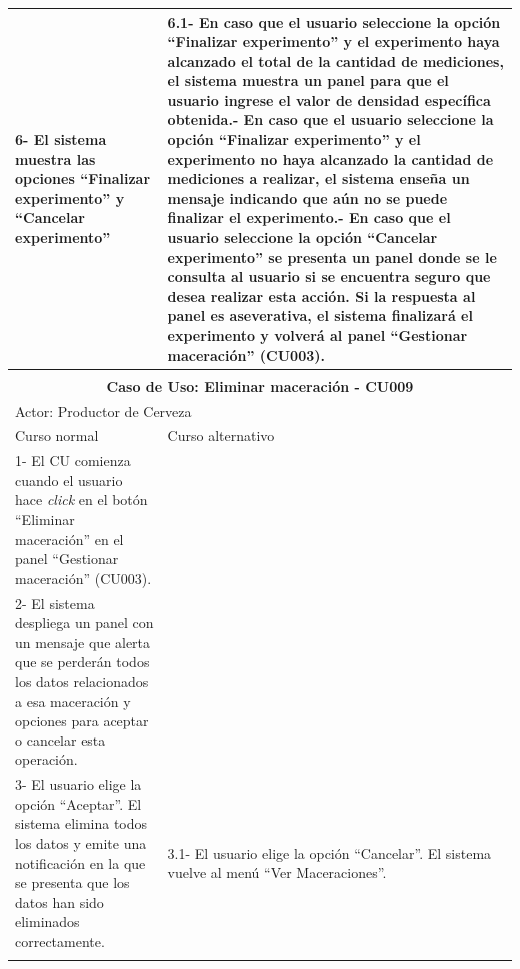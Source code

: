 \begin{longtable}{|p{7cm}|p{7cm}|}
        6- El sistema muestra las opciones ``Finalizar experimento'' y ``Cancelar experimento'' & 6.1- En caso que el usuario seleccione la opción ``Finalizar experimento'' y el experimento haya alcanzado el total de la cantidad de mediciones, el sistema muestra un panel para que el usuario ingrese el valor de densidad específica obtenida.\newline 6.2- En caso que el usuario seleccione la opción ``Finalizar experimento'' y el experimento no haya alcanzado la cantidad de mediciones a realizar, el sistema enseña un mensaje indicando que aún no se puede finalizar el experimento.\newline 
        6.3- En caso que el usuario seleccione la opción ``Cancelar experimento'' se presenta un panel donde se le consulta al usuario si se encuentra seguro que desea realizar esta acción. Si la respuesta al panel es aseverativa, el sistema finalizará el experimento y volverá al panel ``Gestionar maceración'' (CU003).\\
        \hline
       \multicolumn{2}{c}{ }\\
        \hline
        
        \multicolumn{2}{|c|}{\textbf{Caso de Uso: Eliminar maceración - CU009}} \\
        \hline
        \multicolumn{2}{|l|}{Actor: Productor de Cerveza} \\
        \hline
        Curso normal & Curso alternativo \\
        \hline
        1- El CU comienza cuando el usuario hace \textit{click} en el botón ``Eliminar maceración'' en el panel ``Gestionar maceración'' (CU003). & \\
        \hline
        2- El sistema despliega un panel con un mensaje que alerta que se perderán todos los datos relacionados a esa maceración y opciones para aceptar o cancelar esta operación. &
        \\
        \hline
        3- El usuario elige la opción ``Aceptar''. El sistema elimina todos los datos y emite una notificación en la que se presenta que los datos han sido eliminados correctamente. & 3.1- El usuario elige la opción ``Cancelar''. El sistema vuelve al menú ``Ver Maceraciones''.
        \\
        \hline
        \multicolumn{2}{c}{ }\\
        

\end{longtable}
